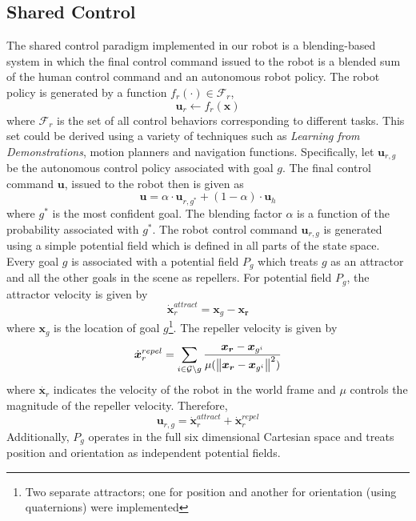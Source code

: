 \subsection{Shared Control}\label{ssec:shared}
The shared control paradigm implemented in our robot is a blending-based system in  which the final control command issued to the robot is a blended sum of the human control command and an autonomous robot policy.
The robot policy is generated by a function $f_{r}(\cdot) \in \mathcal{F}_{r}$, 
\begin{equation*}
\boldsymbol{u}_r \leftarrow f_{r}(\boldsymbol{x})
\end{equation*}
where $\mathcal{F}_{r}$ is the set of all control behaviors corresponding to different tasks. This set could be derived using a variety of techniques such as \textit{Learning from Demonstrations}, motion planners and navigation functions. Specifically, let $\boldsymbol{u}_{r,g}$ be the autonomous control policy associated with goal $g$. The final control command $\boldsymbol{u}$, issued to the robot then is given as 
\begin{equation*}
\boldsymbol{u} = \alpha\cdot \boldsymbol{u}_{r,g^*} + (1 - \alpha)\cdot \boldsymbol{u}_h
\end{equation*}
where $g^*$ is the most confident goal. The blending factor $\alpha$ is a function of the probability associated with $g^*$.
The robot control command $\boldsymbol{u}_{r,g}$ is generated using a simple potential field which is defined in all parts of the state space. Every goal $g$ is associated with a potential field $P_g$ which treats $g$ as an attractor and all the other goals in the scene as repellers. For potential field $P_g$, the attractor velocity is given by
\begin{equation*}
\dot{\boldsymbol{x}}_r^{attract} = \boldsymbol{x}_{g} - \boldsymbol{x_r}
\end{equation*}
where $\boldsymbol{x}_{g}$ is the location of goal $g$\footnote{Two separate attractors; one for position and another for orientation (using quaternions) were implemented}. The repeller velocity is given by
\begin{equation*}
\dot{\boldsymbol{x}}_r^{repel} = \sum_{i \in \mathcal{G} \setminus g} \frac{\boldsymbol{x_r} - \boldsymbol{x}_{g^i}}{\mu(\left\lVert\boldsymbol{x_r} - \boldsymbol{x}_{g^i}\right\rVert^2)}
\end{equation*}
where $\dot{\boldsymbol{x}_r}$ indicates the velocity of the robot in the world frame and $\mu$ controls the magnitude of the repeller velocity. Therefore, 
\begin{equation*}
\boldsymbol{u}_{r,g} = \dot{\boldsymbol{x}}_r^{attract} + \dot{\boldsymbol{x}}_r^{repel} 
\end{equation*}
Additionally, $P_g$ operates in the full six dimensional Cartesian space and treats position and orientation as independent potential fields. 
%
%
%

